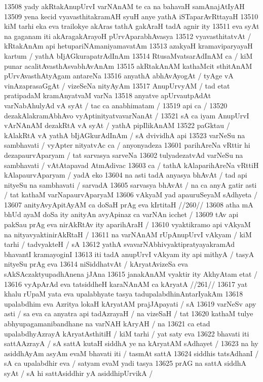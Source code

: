 13508 yady akRtakAnupUrvI varNAnAM te ca na bahavaH samAnajAtIyAH 
13509 yena kecid vyavasthitakramAH syuH anye yathA iSTaparAvRttayaH  
13510 kiM tarhi eka eva trailokye akAras tathA gakAraH tadA agnir ity 
13511 eva syAt na gaganam iti akAragakArayoH pUrvAparabhAvasya 
13512 vyavasthitatvAt / kRtakAnAm api hetupariNAmaniyamavatAm
13513 azakyaH kramaviparyayaH kartum / yathA bIjAGkurapatrAdInAm  
13514 RtusaMvatsarAdInAM ca / kiM punar acalitAvasthAsvabhAvAnAm
13515 akRtakAnAM kathaMcit sthitAnAM pUrvAvasthAtyAgam antareNa 
13516 anyathA abhAvAyogAt / tyAge vA vinAzaprasaGgAt / vizeSeNa nityAyAm
13517 AnupUrvyAM / tad etat pratipadaM kramAnyatvaM varNa  
13518 anyatve apUrvautpAdAt varNabAhulyAd vA syAt / tac ca anabhimatam /
13519 api ca /
13520 	dezakAlakramAbhAvo vyAptinityatvavarNanAt / 
13521 sA ca iyam AnupUrvI vArNAnAM dezakRtA vA syAt / yathA pipIlikAnAM
13522 paGktau / kAlakRtA vA yathA bIjAGkurAdInAm / sA dvividhA api
13523 varNeSu na sambhavati / vyApter nityatvAc ca / anyonyadeza
13601 parihAreNa vRttir hi dezapaurvAparyam / tat sarvasya sarveNa  
13602 tulyadezatvAd varNeSu na sambhavati / vAtAtapavad AtmAdivac 
13603 ca / tathA kAlaparihAreNa vRttiH kAlapaurvAparyam / yadA eko
13604 na asti tadA anyasya bhAvAt / tad api nityeSu na sambhavati / sarvadA 
13605 sarvasya bhAvAt / na ca anyA gatir asti / tat kathaM varNapaurvAparyaM
13606 vAkyaM yad apauruSeyaM sAdhyeta /
13607 	anityAvyApitAyAM ca doSaH prAg eva kIrtitaH //260//  
13608 atha mA bhUd ayaM doSa ity anityAn avyApinaz ca varNAn icchet /
13609 tAv api pakSau prAg eva nirAkRtAv ity aparihAraH / 
13610 	vyaktikramo api vAkyaM na nityavyaktinirAkRtaH / 
13611 na varNAnAM rUpAnupUrvI vAkyam / kiM tarhi / tadvyakteH / sA 
13612 yathA svavarNAbhivyaktipratyayakramAd bhavantI kramayoginI
13613 iti tadA anupUrvI vAkyam ity api mithyA / tasyA nityeSu prAg eva
13614 niSiddhatvAt / kAryatAvizeSa eva sAkSAczaktyupadhAnena jJAna
13615 janakAnAM vyaktir ity AkhyAtam etat /
13616 	vyApArAd eva tatsiddheH karaNAnAM ca kAryatA //261//
13617 yat khalu rUpaM yata eva upalabhyate tasya tadupalabdhinAntarIyakAm 
13618 upalabdhim eva Azritya lokaH kAryatAM prajJApayati / sA  
13619 varNeSv apy asti / sa eva ca anyatra api tadAzrayaH / na vizeSaH / tat  
13620 kathaM tulye abhyupagamanibandhane na varNAH kAryAH / na  
13621 ca etad upalabdhyAzrayA kAryatAsthitiH / kiM tarhi / yat saty eva
13622 bhavati iti sattAAzrayA / sA sattA kutaH siddhA ye na kAryatAM sAdhayet /
13623 na hy asiddhAyAm asyAm evaM bhavati iti / tasmAt sattA  
13624 siddhis tatsAdhanI / sA ca upalabdhir eva / satyam evaM yadi tasya 
13625 prAG na sattA siddhA syAt / sA hi sattAsiddhir yA asiddhipUrvikA /
